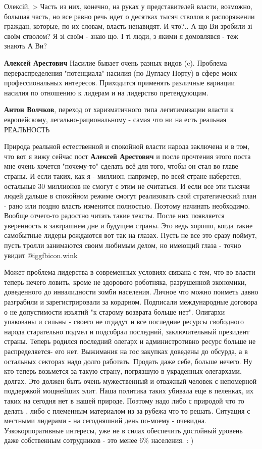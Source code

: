 \begin{itemize}
Олексій,
> Часть из них, конечно, на руках у представителей власти, возможно, большая часть, но все равно речь идет о десятках тысяч стволов в распоряжении граждан, которые, по их словам, власть ненавидят. И что?..
А що Ви зробили зі своїм стволом?
Я зі своїм - знаю що. І ті люди, з якими я домовлявся - теж знають
А Ви?

\textbf{Алексей Арестович} Насилие бывает очень разных видов (c). Проблема перераспределения "потенциала" насилия (по Дугласу Норту) в сфере моих профессиональных интересов. Приходится применять различные вариации насилия по отношению к лидерам и на лидерство претендующим.

\textbf{Антон Волчков}, переход от харизматичного типа легитимизации власти к европейскому, легально-рациональному - самая что ни на есть реальная РЕАЛЬНОСТЬ


Природа реальной естественной и спокойной власти народа заключена и в том, что
вот я вижу сейчас пост \textbf{Алексей Арестович} и после прочтения этого поста мне
очень хочется "почему-то" сделать всё для того, чтобы он стал во главе страны.
И если таких, как я - миллион, например, по всей стране наберется, остальные 30
миллионов не смогут с этим не считаться. И если все эти тысячи людей дальше в
спокойном режиме смогут реализовать свой стратегический план - рано или поздно
власть изменится полностью. Поэтому начинать необходимо. Вообще отчего-то
радостно читать такие тексты. После них появляется уверенность в завтрашнем дне
и будущем страны. Это ведь хорошо, когда такие самобытные лидеры рождаются вот
так на глазах. Пусть не все это сразу поймут, пусть тролли занимаются своим
любимым делом, но имеющий глаза - точно увидит  @igg{fbicon.wink} 


Может проблема лидерства в современных условиях связана с тем, что во власти
теперь нечего ловить, кроме не здорового роботняка, разрушенной экономики,
доведенного до инвалидности зомби населения. Личное что можно поиметь давно
разграбили и зарегистрировали за кордрном. Подписали международные договора о
не допустимости изъятий "к старому возврата больше нет". Олигархи упакованы и
сильны - своего не отдадут и все последние ресурсы свободного народа
старательно подмел и подсобрал последний, заключительный президент страны.
Теперь родился последний олегарх и администротивно ресурс больше не
распределяется- его нет. Выжимания на гос закупках доведены до обсурда, а в
остальных секторах надо долго работать. Продать даже себе, больше нечего. Ну
кто теперь возьмется за такую страну, погрязшую в украденных олегархами,
долгах. Это должен быть очень мужественный и отважный человек с непомерной
поддержкой мощнейших элит. Наша политика таких убивала еще в пеленках, их таких
на сегодня нет в нашей природе. Поэтому надо либо с природой что то делать ,
либо с племенным материалом из за рубежа что то решать. Ситуация с местными
лидерами - на сегодняшний день по-моему - очевидна. Узкокорпоративные интересы,
уже не в силах обеспечить достойный уровень даже собственным сотрудников - это
менее 6\% населения. : )


\end{itemize}
